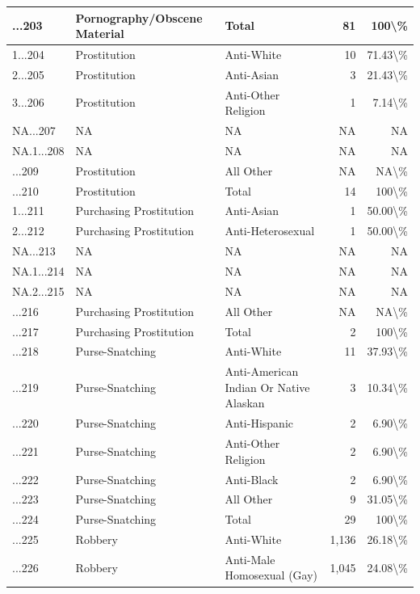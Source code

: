 \documentclass[
]{krantz}
\begin{document}
\begin{longtable}[t]{l|l|l|r|r}
\hline
...203 & Pornography/Obscene Material & Total & 81 & 100\textbackslash{}\%\\
\hline
1...204 & Prostitution & Anti-White & 10 & 71.43\textbackslash{}\%\\
\hline
2...205 & Prostitution & Anti-Asian & 3 & 21.43\textbackslash{}\%\\
\hline
3...206 & Prostitution & Anti-Other Religion & 1 & 7.14\textbackslash{}\%\\
\hline
NA...207 & NA & NA & NA & NA\\
\hline
NA.1...208 & NA & NA & NA & NA\\
\hline
...209 & Prostitution & All Other & NA & NA\textbackslash{}\%\\
\hline
...210 & Prostitution & Total & 14 & 100\textbackslash{}\%\\
\hline
1...211 & Purchasing Prostitution & Anti-Asian & 1 & 50.00\textbackslash{}\%\\
\hline
2...212 & Purchasing Prostitution & Anti-Heterosexual & 1 & 50.00\textbackslash{}\%\\
\hline
NA...213 & NA & NA & NA & NA\\
\hline
NA.1...214 & NA & NA & NA & NA\\
\hline
NA.2...215 & NA & NA & NA & NA\\
\hline
...216 & Purchasing Prostitution & All Other & NA & NA\textbackslash{}\%\\
\hline
...217 & Purchasing Prostitution & Total & 2 & 100\textbackslash{}\%\\
\hline
...218 & Purse-Snatching & Anti-White & 11 & 37.93\textbackslash{}\%\\
\hline
...219 & Purse-Snatching & Anti-American Indian Or Native Alaskan & 3 & 10.34\textbackslash{}\%\\
\hline
...220 & Purse-Snatching & Anti-Hispanic & 2 & 6.90\textbackslash{}\%\\
\hline
...221 & Purse-Snatching & Anti-Other Religion & 2 & 6.90\textbackslash{}\%\\
\hline
...222 & Purse-Snatching & Anti-Black & 2 & 6.90\textbackslash{}\%\\
\hline
...223 & Purse-Snatching & All Other & 9 & 31.05\textbackslash{}\%\\
\hline
...224 & Purse-Snatching & Total & 29 & 100\textbackslash{}\%\\
\hline
...225 & Robbery & Anti-White & 1,136 & 26.18\textbackslash{}\%\\
\hline
...226 & Robbery & Anti-Male Homosexual (Gay) & 1,045 & 24.08\textbackslash{}\%\\

\end{longtable}
\end{document}
